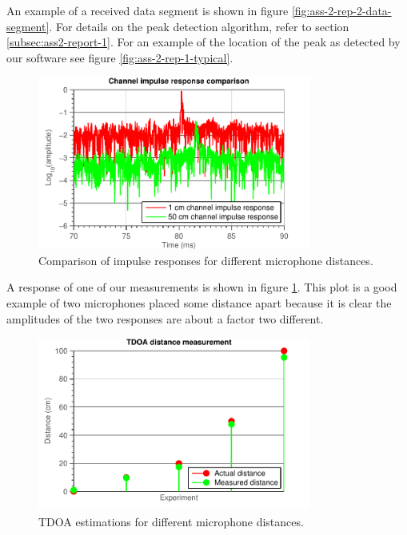 \documentclass[11pt,titlepage]{report}
\begin{document}
An example of a received data segment is shown in figure \ref{fig:ass-2-rep-2-data-segment}. For details on the peak detection algorithm, refer to section \ref{subsec:ass2-report-1}. For an example of the location of the peak as detected by our software see figure \ref{fig:ass-2-rep-1-typical}.

\begin{figure}[H]
	\centering
	\includegraphics[width=0.8\textwidth]{../../deliverable-7-resources/figures/ass-2/report-2-3/ass-2-report-2-impulse-responses-4.pdf}
	\caption{Comparison of impulse responses for different microphone distances.}
	\label{fig:ass-2-rep-2-impulse-1-20}
\end{figure}

A response of one of our measurements is shown in figure \ref{fig:ass-2-rep-2-impulse-1-20}. This plot is a good example of two microphones placed some distance apart because it is clear the amplitudes of the two responses are about a factor two different. 

\begin{figure}[H]
	\centering
	\includegraphics[width=0.8\textwidth]{../../deliverable-7-resources/figures/ass-2/report-2-3/ass-2-report-2-results.pdf}
	\caption{TDOA estimations for different microphone distances.}
	\label{fig:ass-2-rep-2-result}
\end{figure}
\end{document}
